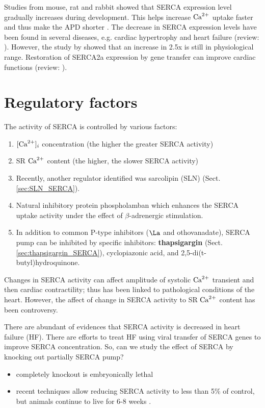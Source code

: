 Studies from mouse, rat and rabbit showed that SERCA expression level gradually
increases during development. This helps increase ${\text{Ca}^{2+}}$ uptake faster and thus
make the APD shorter \citep{periasamy2001}. The decrease in SERCA expression
levels have been found in several diseases, e.g. cardiac hypertrophy and heart
failure (review: \citep{lompre2010}). However, the study by
\citep{periasamy2001} showed that an increase in 2.5x is still in physiological
range. Restoration of SERCA2a expression by gene transfer can improve cardiac
functions \citep{Lipskaia2010, Kairouz2012} (review: \citep{chemaly2013}).  


\section{Regulatory factors}
\label{sec:SERCA_activity}

The activity of SERCA is controlled by various factors:
\begin{enumerate}
  \item $[{\text{Ca}^{2+}}]_i$ concentration (the higher the greater SERCA activity)
  \item SR ${\text{Ca}^{2+}}$ content (the higher, the slower SERCA activity)
  \item Recently, another regulator identified was sarcolipin (SLN)
  (Sect.\ref{sec:SLN_SERCA}).
  
  \item Natural inhibitory protein phospholamban \citep{tada1974} which
  enhances the SERCA uptake activity under the effect of $\beta$-adrenergic
  stimulation.
  
  \item In addition to common P-type inhibitors ($\La$ and othovanadate), SERCA
  pump can
be inhibited by specific inhibitors: {\bf thapsigargin}
(Sect.\ref{sec:thapsigargin_SERCA}), cyclopiazonic acid, and
2,5-di(t-butyl)hydroquinone. 
   
\end{enumerate}

Changes in SERCA activity can affect amplitude of systolic ${\text{Ca}^{2+}}$ transient and
then cardiac contractility; thus has been linked to pathological conditions of
the heart. However, the affect of change in SERCA activity to SR ${\text{Ca}^{2+}}$ content
has been controversy.  

There are abundant of evidences that SERCA activity is decreased in heart
failure (HF)\citep{hasenfuss1994, hobai2001}. There are efforts to treat HF
using viral transfer of SERCA genes to improve SERCA
concentration\citep{kawase2011}. So, can we study the effect of SERCA by
knocking out partially SERCA pump?
\begin{itemize}
  \item completely knockout is embryonically lethal \citep{periasamy1999}
  \item recent techniques allow reducing SERCA activity to less than 5\% of
  control, but animals continue to live for 6-8 weeks \citep{andersson2009}.  
\end{itemize}


